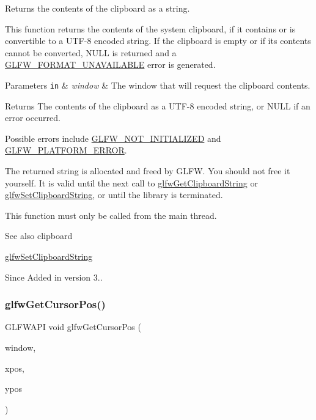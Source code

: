 Returns the contents of the clipboard as a string. 

This function returns the contents of the system clipboard, if it contains or is convertible to a U\+T\+F-\/8 encoded string. If the clipboard is empty or if its contents cannot be converted, {\ttfamily N\+U\+LL} is returned and a \hyperlink{group__errors_ga196e125ef261d94184e2b55c05762f14}{G\+L\+F\+W\+\_\+\+F\+O\+R\+M\+A\+T\+\_\+\+U\+N\+A\+V\+A\+I\+L\+A\+B\+LE} error is generated.


\begin{DoxyParams}[1]{Parameters}
\mbox{\tt in}  & {\em window} & The window that will request the clipboard contents. \\
\hline
\end{DoxyParams}
\begin{DoxyReturn}{Returns}
The contents of the clipboard as a U\+T\+F-\/8 encoded string, or {\ttfamily N\+U\+LL} if an error occurred.
\end{DoxyReturn}
Possible errors include \hyperlink{group__errors_ga2374ee02c177f12e1fa76ff3ed15e14a}{G\+L\+F\+W\+\_\+\+N\+O\+T\+\_\+\+I\+N\+I\+T\+I\+A\+L\+I\+Z\+ED} and \hyperlink{group__errors_gad44162d78100ea5e87cdd38426b8c7a1}{G\+L\+F\+W\+\_\+\+P\+L\+A\+T\+F\+O\+R\+M\+\_\+\+E\+R\+R\+OR}.

The returned string is allocated and freed by G\+L\+FW. You should not free it yourself. It is valid until the next call to \hyperlink{group__input_ga3ac90c8bbaf0b46063bb02b574f3b6f7}{glfw\+Get\+Clipboard\+String} or \hyperlink{group__input_ga7a580309bbc185a0459c3559021d2fd7}{glfw\+Set\+Clipboard\+String}, or until the library is terminated.

This function must only be called from the main thread.

\begin{DoxySeeAlso}{See also}
clipboard 

\hyperlink{group__input_ga7a580309bbc185a0459c3559021d2fd7}{glfw\+Set\+Clipboard\+String}
\end{DoxySeeAlso}
\begin{DoxySince}{Since}
Added in version 3.. 
\end{DoxySince}
\mbox{\label{group__input_gad289438eb7cf53d11eca685373f44105}} 
\subsubsection{\texorpdfstring{glfw\+Get\+Cursor\+Pos()}{glfwGetCursorPos()}}
{\footnotesize\ttfamily G\+L\+F\+W\+A\+PI void glfw\+Get\+Cursor\+Pos (\begin{DoxyParamCaption}\item[{\hyperlink{group__window_ga3c96d80d363e67d13a41b5d1821f3242}{G\+L\+F\+Wwindow} $\ast$}]{window,  }\item[{double $\ast$}]{xpos,  }\item[{double $\ast$}]{ypos }\end{DoxyParamCaption})}



